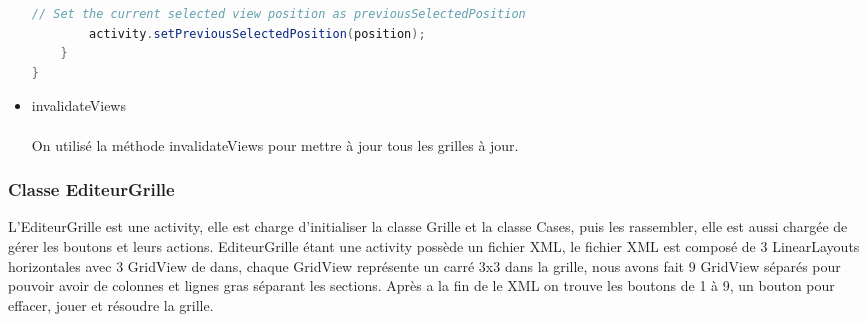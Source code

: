 \documentclass{article}
\begin{document}
\begin{itemize}
\begin{lstlisting}[language=Java, caption = Exemple d'une methode dans onclick]
        // Set the current selected view position as previousSelectedPosition
        activity.setPreviousSelectedPosition(position);
    }
}
\end{lstlisting}






\item{invalidateViews}
\\
\\
On utilisé la méthode invalidateViews pour mettre à jour tous les grilles à jour. 
\end{itemize}

\subsubsection{Classe EditeurGrille}
L’EditeurGrille est une activity, elle est charge d'initialiser la classe Grille et la classe Cases, puis les rassembler, elle est aussi chargée de gérer les boutons et leurs actions. EditeurGrille étant une activity possède un fichier XML, le fichier XML est composé de 3 LinearLayouts horizontales avec 3 GridView de dans, chaque GridView représente un carré 3x3 dans la grille, nous avons fait 9 GridView séparés pour pouvoir avoir de colonnes et lignes gras séparant les sections.  Après a la fin de le XML on trouve les boutons de 1 à 9, un bouton pour effacer, jouer et résoudre la grille.
\end{document}
